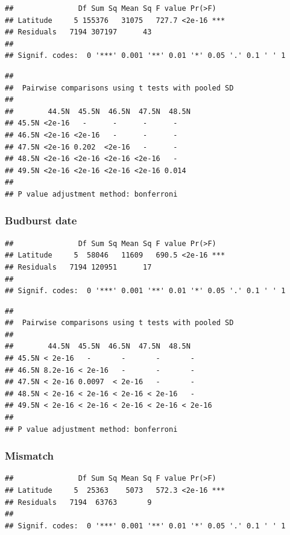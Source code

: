 \documentclass[12 pt]{article}
\begin{document}
\begin{verbatim}
##               Df Sum Sq Mean Sq F value Pr(>F)    
## Latitude     5 155376   31075   727.7 <2e-16 ***
## Residuals   7194 307197      43                   
## 
## Signif. codes:  0 '***' 0.001 '**' 0.01 '*' 0.05 '.' 0.1 ' ' 1
\end{verbatim}

\begin{verbatim}
## 
##  Pairwise comparisons using t tests with pooled SD 
## 
##        44.5N  45.5N  46.5N  47.5N  48.5N
## 45.5N <2e-16   -      -      -      -    
## 46.5N <2e-16 <2e-16   -      -      -    
## 47.5N <2e-16 0.202  <2e-16   -      -    
## 48.5N <2e-16 <2e-16 <2e-16 <2e-16   -    
## 49.5N <2e-16 <2e-16 <2e-16 <2e-16 0.014
## 
## P value adjustment method: bonferroni
\end{verbatim}

\subsubsection*{Budburst date}

\begin{verbatim}
##               Df Sum Sq Mean Sq F value Pr(>F)    
## Latitude     5  58046   11609   690.5 <2e-16 ***
## Residuals   7194 120951      17                   
## 
## Signif. codes:  0 '***' 0.001 '**' 0.01 '*' 0.05 '.' 0.1 ' ' 1
\end{verbatim}

\begin{verbatim}
## 
##  Pairwise comparisons using t tests with pooled SD 
##  
##        44.5N  45.5N  46.5N  47.5N  48.5N
## 45.5N < 2e-16   -       -       -       -      
## 46.5N 8.2e-16 < 2e-16   -       -       -      
## 47.5N < 2e-16 0.0097  < 2e-16   -       -      
## 48.5N < 2e-16 < 2e-16 < 2e-16 < 2e-16   -      
## 49.5N < 2e-16 < 2e-16 < 2e-16 < 2e-16 < 2e-16
## 
## P value adjustment method: bonferroni
\end{verbatim}

\subsubsection*{Mismatch}

\begin{verbatim}
##               Df Sum Sq Mean Sq F value Pr(>F)    
## Latitude     5  25363    5073   572.3 <2e-16 ***
## Residuals   7194  63763       9                   
## 
## Signif. codes:  0 '***' 0.001 '**' 0.01 '*' 0.05 '.' 0.1 ' ' 1
\end{verbatim}
\end{document}
